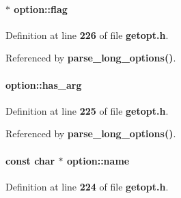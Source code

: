 \paragraph[{flag}]{ $\ast$ option\+::flag}\label{structoption_a24ad4639d5d498fdc1c5b38bcaabc263}


Definition at line {\bf 226} of file {\bf getopt.\+h}.



Referenced by {\bf parse\+\_\+long\+\_\+options()}.

\paragraph[{has\+\_\+arg}]{ option\+::has\+\_\+arg}\label{structoption_a90d7ee9a51eea5c002682dbd0af149e4}


Definition at line {\bf 225} of file {\bf getopt.\+h}.



Referenced by {\bf parse\+\_\+long\+\_\+options()}.

\paragraph[{name}]{\setlength{\rightskip}{0pt plus 5cm}const char $\ast$ option\+::name}\label{structoption_ae02f2d0cea6af34951d9008be8bfa625}


Definition at line {\bf 224} of file {\bf getopt.\+h}.



